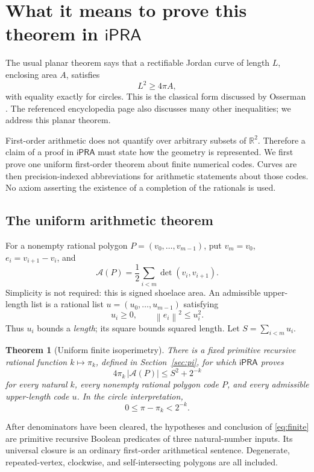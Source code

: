 \documentclass[11pt,a4paper]{article}
\newtheorem{theorem}{Theorem}[section]
\theoremstyle{definition}
\newcommand{\ipra}{\mathsf{iPRA}}
\newcommand{\norm}[1]{\left\|#1\right\|}
\newcommand{\Area}{\mathcal A}
\begin{document}
\section{What it means to prove this theorem in \texorpdfstring{\(\ipra\)}{iPRA}}

The usual planar theorem says that a rectifiable Jordan curve of
length \(L\), enclosing area \(A\), satisfies
\[
 L^2\ge4\pi A,
\]
with equality exactly for circles. This is the classical form discussed
by Osserman \cite{osserman}. The referenced encyclopedia page also
discusses many other inequalities; we address this planar theorem.

First-order arithmetic does not quantify over arbitrary subsets of
\(\mathbb R^2\). Therefore a claim of a proof in \(\ipra\)
must state how the geometry is represented. We first prove one uniform
first-order theorem about finite numerical codes. Curves are then
precision-indexed abbreviations for arithmetic statements about those
codes. No axiom asserting the existence of a completion of the rationals
is used.

\subsection{The uniform arithmetic theorem}
For a nonempty rational polygon
\(P=(v_0,\ldots,v_{m-1})\), put \(v_m=v_0\), \(e_i=v_{i+1}-v_i\), and
\[
 \Area(P)=\frac12\sum_{i<m}\det(v_i,v_{i+1}).
\]
Simplicity is not required: this is signed shoelace area.
An admissible upper-length list is a rational list
\(u=(u_0,\ldots,u_{m-1})\) satisfying
\[
 u_i\ge0,\qquad \norm{e_i}^2\le u_i^2.
 \tag{1.1}\label{eq:input}
\]
Thus \(u_i\) bounds a \emph{length}; its square bounds squared length.
Let \(S=\sum_{i<m}u_i\).

\begin{theorem}[Uniform finite isoperimetry]\label{thm:finite}
There is a fixed primitive recursive rational function \(k\mapsto\pi_k\),
defined in Section~\ref{sec:pi}, for which \(\ipra\) proves
\[
 \boxed{4\pi_k\,|\Area(P)|\le S^2+2^{-k}}
 \tag{1.2}\label{eq:finite}
\]
for every natural \(k\), every nonempty rational polygon code \(P\),
and every admissible upper-length code \(u\).
In the circle interpretation,
\[
 0\le\pi-\pi_k<2^{-k}.
 \tag{1.3}\label{eq:piaccuracy}
\]
\end{theorem}
After denominators have been cleared, the hypotheses and conclusion of
\eqref{eq:finite} are primitive recursive Boolean predicates of three
natural-number inputs. Its universal closure is an ordinary first-order
arithmetical sentence. Degenerate, repeated-vertex, clockwise, and
self-intersecting polygons are all included.
\end{document}
